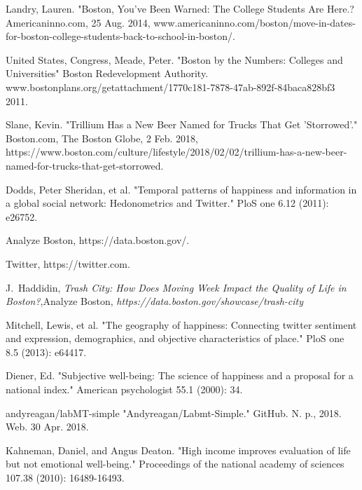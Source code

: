 \documentclass[journal, a4paper]{IEEEtran}
\begin{document}
\begin{thebibliography}{5}

    Landry, Lauren. "Boston, You've Been Warned: The College Students Are Here.? Americaninno.com, 25 Aug. 2014, www.americaninno.com/boston/move-in-dates-for-boston-college-students-back-to-school-in-boston/.
    
    United States, Congress, Meade, Peter. "Boston by the Numbers: Colleges and Universities" Boston Redevelopment Authority. www.bostonplans.org/getattachment/1770c181-7878-47ab-892f-84baca828bf3 2011.
    
    Slane, Kevin. "Trillium Has a New Beer Named for Trucks That Get 'Storrowed'." Boston.com, The Boston Globe, 2 Feb. 2018, https://www.boston.com/culture/lifestyle/2018/02/02/trillium-has-a-new-beer-named-for-trucks-that-get-storrowed.
    
    Dodds, Peter Sheridan, et al. "Temporal patterns of happiness and information in a global social network: Hedonometrics and Twitter." PloS one 6.12 (2011): e26752.
    
    Analyze Boston, https://data.boston.gov/.

   Twitter, https://twitter.com.
   
   J.~Haddidin,  \emph{Trash City: How Does Moving Week Impact the Quality of Life in Boston?},\relax Analyze Boston,  \emph{https://data.boston.gov/showcase/trash-city}
   
   Mitchell, Lewis, et al. "The geography of happiness: Connecting twitter sentiment and expression, demographics, and objective characteristics of place." PloS one 8.5 (2013): e64417.
   
   Diener, Ed. "Subjective well-being: The science of happiness and a proposal for a national index." American psychologist 55.1 (2000): 34.
   
   andyreagan/labMT-simple
"Andyreagan/Labmt-Simple." GitHub. N. p., 2018. Web. 30 Apr. 2018.
   
   Kahneman, Daniel, and Angus Deaton. "High income improves evaluation of life but not emotional well-being." Proceedings of the national academy of sciences 107.38 (2010): 16489-16493.
   

\end{thebibliography}
\end{document}
